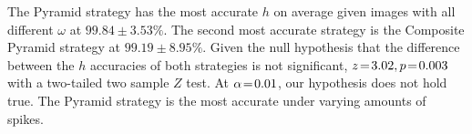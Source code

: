 The Pyramid strategy has the most accurate $h$ on average given images with all different $\omega$ at $99.84\!\pm\!3.53\%$.
The second most accurate strategy is the Composite Pyramid strategy at $99.19\!\pm\!8.95\%$.
Given the null hypothesis that the difference between the $h$ accuracies of both strategies is not significant,
$z \!=\! 3.02, p \!=\! 0.003$ with a two-tailed two sample $Z$ test.
At $\alpha \!=\! 0.01$, our hypothesis does not hold true.
The Pyramid strategy is the most accurate under varying amounts of spikes.
